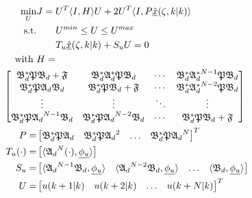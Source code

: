 \begin{equation} \label{eq:MPC_QP}
    \begin{aligned}
        \min_{U} &J = U^T \langle I,H \rangle U + 2U^T \langle I, P \underline{\hat{x}}(\zeta, k|k) \rangle \\
        \text{s.t.} &\qquad U^{min} \leq U \leq U^{max} \\
        &\qquad T_u \underline{\hat{x}}(\zeta, k|k) + S_u U = 0
        \, \\
        \text{with } &H = \\
        &\hspace{-3.5em }\begin{bmatrix}
            \mathfrak{B}_d^* \mathfrak{P} \mathfrak{B}_d + \mathfrak{F} & \mathfrak{B}_d^* \mathfrak{A}_d^* \mathfrak{P} \mathfrak{B}_d & \cdots &  \mathfrak{B}_d^* {\mathfrak{A}_d^*}^{N-1} \mathfrak{P} \mathfrak{B}_d \\
            \mathfrak{B}_d^* \mathfrak{P} \mathfrak{A}_d \mathfrak{B}_d & \mathfrak{B}_d^* \mathfrak{P} \mathfrak{B}_d + \mathfrak{F} & \cdots & \mathfrak{B}_d^* {\mathfrak{A}_d^*}^{N-2} \mathfrak{P} \mathfrak{B}_d \\
            \vdots & \vdots & \ddots & \vdots \\
            \mathfrak{B}_d^* \mathfrak{P} {\mathfrak{A}_d}^{N-1} \mathfrak{B}_d & \mathfrak{B}_d^* \mathfrak{P} {\mathfrak{A}_d}^{N-2} \mathfrak{B}_d & \cdots & \mathfrak{B}_d^* \mathfrak{P} \mathfrak{B}_d + \mathfrak{F}
        \end{bmatrix} \\
        P = &\begin{bmatrix}
            \mathfrak{B}_d^* \mathfrak{P} {\mathfrak{A}_d} &
            \mathfrak{B}_d^* \mathfrak{P} {\mathfrak{A}_d}^{2}  &
            \hdots &
            \mathfrak{B}_d^* \mathfrak{P} {\mathfrak{A}_d}^{N} 
        \end{bmatrix}^T \\
        T_u (\cdot) = &\begin{bmatrix}
            \langle {\mathfrak{A}_d}^{N} (\cdot), \underline{\phi_u} \rangle
        \end{bmatrix} \\
        S_u = &\begin{bmatrix}
            \langle {\mathfrak{A}_d}^{N-1} \mathfrak{B}_d, \underline{\phi_u} \rangle & 
            \langle {\mathfrak{A}_d}^{N-2} \mathfrak{B}_d, \underline{\phi_u} \rangle &
            \hdots &
            \langle \mathfrak{B}_d, \underline{\phi_u} \rangle
        \end{bmatrix} \\
        U = &\begin{bmatrix}
            u(k+1|k) & u(k+2|k) & \hdots & u(k+N|k)
        \end{bmatrix}^T
    \end{aligned}
\end{equation}